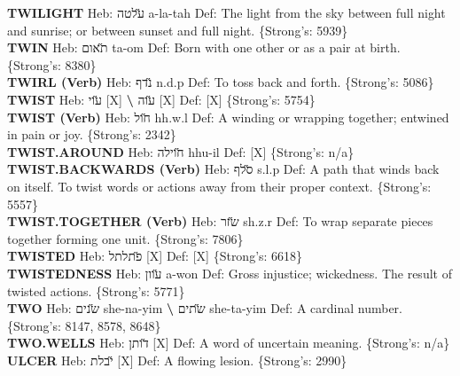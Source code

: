 {\textbf{TWILIGHT} Heb: {\large\H עלטה} a-la-tah Def: The light from the sky between full night and sunrise; or between sunset and full night. \{Strong's: 5939\}\hfill{}\\

\textbf{TWIN} Heb: {\large\H תאום} ta-om Def: Born with one other or as a pair at birth. \{Strong's: 8380\}\hfill{}\\

\textbf{TWIRL (Verb)} Heb: {\large\H נדף} n.d.p Def: To toss back and forth. \{Strong's: 5086\}\hfill{}\\

\textbf{TWIST} Heb: {\large\H עוי} {[}X{]} \textbf{\textbackslash{}} {\large\H עוה} {[}X{]} Def: {[}X{]} \{Strong's: 5754\}\hfill{}\\

\textbf{TWIST (Verb)} Heb: {\large\H חול} hh.w.l Def: A winding or wrapping together; entwined in pain or joy. \{Strong's: 2342\}\hfill{}\\

\textbf{TWIST.AROUND} Heb: {\large\H חוילה} hhu-il Def: {[}X{]} \{Strong's: n/a\}\hfill{}\\

\textbf{TWIST.BACKWARDS (Verb)} Heb: {\large\H סלף} s.l.p Def: A path that winds back on itself. To twist words or actions away from their proper context. \{Strong's: 5557\}\hfill{}\\

\textbf{TWIST.TOGETHER (Verb)} Heb: {\large\H שזר} sh.z.r Def: To wrap separate pieces together forming one unit. \{Strong's: 7806\}\hfill{}\\

\textbf{TWISTED} Heb: {\large\H פתלתל} {[}X{]} Def: {[}X{]} \{Strong's: 6618\}\hfill{}\\

\textbf{TWISTEDNESS} Heb: {\large\H עוון} a-won Def: Gross injustice; wickedness. The result of twisted actions. \{Strong's: 5771\}\hfill{}\\

\textbf{TWO} Heb: {\large\H שנים} she-na-yim \textbf{\textbackslash{}} {\large\H שתים} she-ta-yim Def: A cardinal number. \{Strong's: 8147, 8578, 8648\}\hfill{}\\

\textbf{TWO.WELLS} Heb: {\large\H דותן} {[}X{]} Def: A word of uncertain meaning. \{Strong's: n/a\}\hfill{}\\

\textbf{ULCER} Heb: {\large\H יבלת} {[}X{]} Def: A flowing lesion. \{Strong's: 2990\}\hfill{}\\

}
